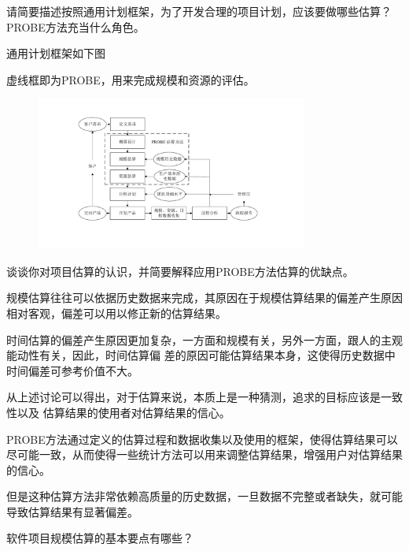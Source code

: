 \begin{problem}[2020]
请简要描述按照通用计划框架，为了开发合理的项目计划，应该要做哪些估算？PROBE方法充当什么角色。
\end{problem}

\begin{solution}
通用计划框架如下图

虚线框即为PROBE，用来完成规模和资源的评估。

\begin{figure}[H]
	\centering
	\includegraphics[width=0.8\textwidth]{通用计划框架.pdf}
\end{figure}
\end{solution}



\begin{problem}[2013、2015A、2018]
谈谈你对项目估算的认识，并简要解释应用PROBE方法估算的优缺点。
\end{problem}

\begin{solution}
规模估算往往可以依据历史数据来完成，其原因在于规模估算结果的偏差产生原因相对客观，偏差可以用以修正新的估算结果。

时间估算的偏差产生原因更加复杂，一方面和规模有关，另外一方面，跟人的主观能动性有关，因此，时间估算偏 差的原因可能估算结果本身，这使得历史数据中时间偏差可参考价值不大。

从上述讨论可以得出，对于估算来说，本质上是一种猜测，追求的目标应该是一致性以及 估算结果的使用者对估算结果的信心。

PROBE方法通过定义的估算过程和数据收集以及使用的框架，使得估算结果可以尽可能一致，从而使得一些统计方法可以用来调整估算结果，增强用户对估算结果的信心。

但是这种估算方法非常依赖高质量的历史数据，一旦数据不完整或者缺失，就可能导致估算结果有显著偏差。
\end{solution}



\begin{problem}[2023]
软件项目规模估算的基本要点有哪些？
\end{problem}

